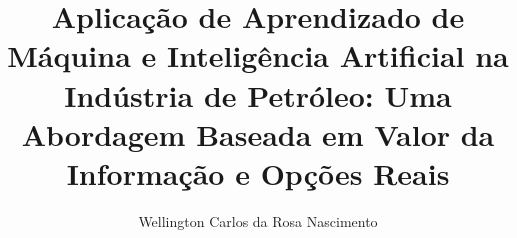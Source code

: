 \documentclass[
  phd,
  brazilian
]{ThesisPUC}
\author{Wellington Carlos da Rosa Nascimento}
\title{Aplicação de Aprendizado de Máquina e Inteligência Artificial na Indústria de Petróleo: Uma Abordagem Baseada em Valor da Informação e Opções Reais}
\begin{document}
  
  
  
  \arial
  
  \normalfont
  
\end{document}
